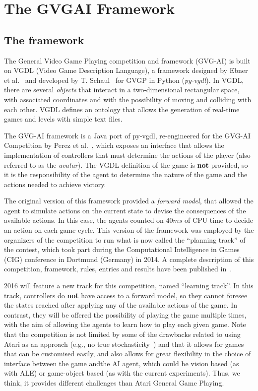 \documentclass[conference]{IEEEtran}
\begin{document}
\section{The GVGAI Framework} \label{sec:framework}


\subsection{The framework} \label{ssec:framework}

The General Video Game Playing competition and framework (GVG-AI) is built on VGDL (Video Game Description Language), a framework designed by Ebner et al.~\cite{Ebner2013} and developed by T. Schaul~\cite{schaul2013pyvgdl} for GVGP in Python (\textit{py-vgdl}). In VGDL, there are several \textit{objects} that interact in a two-dimensional rectangular space, with associated coordinates and with the possibility of moving and colliding with each other. VGDL defines an ontology that allows the generation of real-time games and levels with simple text files.

The GVG-AI framework is a Java port of py-vgdl, re-engineered for the GVG-AI Competition by Perez et al.~\cite{Perez2015}, which exposes an interface that allows the implementation of controllers that must determine the actions of the player (also referred to as the \textit{avatar}). The VGDL definition of the game is \textbf{not} provided, so it is the responsibility of the agent to determine the nature of the game and the actions needed to achieve victory. 

The original version of this framework provided a \textit{forward model}, that allowed the agent to simulate actions on the current state to devise the consequences of the available actions. In this case, the agents counted on $40ms$ of CPU time to decide an action on each game cycle. This version of the framework was employed by the organizers of the competition to run what is now called the ``planning track'' of the contest, which took part during the Computational Intelligence in Games (CIG) conference in Dortmund (Germany) in 2014. A complete description of this competition, framework, rules, entries and results have been published in~\cite{Perez2015}.

2016 will feature a new track for this competition, named ``learning track''. In this track, controllers do \textbf{not} have access to a forward model, so they cannot foresee the states reached after applying any of the available actions of the game. In contrast, they will be offered the possibility of playing the game multiple times, with the aim of allowing the agents to learn how to play each given game. Note that the competition is not limited by some of the drawbacks related to using Atari as an approach (e.g., no true stochasticity~\cite{hausknecht2015impact}) and that it allows for games that can be customised easily, and also allows for great flexibility in the choice of interface between the game andthe AI agent, which could be vision based (as with ALE) or game-object based (as with the current experiments). Thus, we think, it provides different challenges than Atari General Game Playing. 
\end{document}
